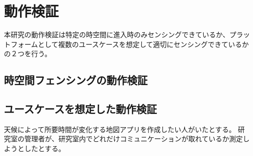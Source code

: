 \chapter{動作検証}
\thispagestyle{myheadings}
本研究の動作検証は特定の時空間に進入時のみセンシングできているか、プラットフォームとして複数のユースケースを想定して適切にセンシングできているかの２つを行う。

\section{時空間フェンシングの動作検証}

\section{ユースケースを想定した動作検証}
天候によって所要時間が変化する地図アプリを作成したい人がいたとする。
研究室の管理者が、研究室内でどれだけコミュニケーションが取れているか測定しようとしたとする。


